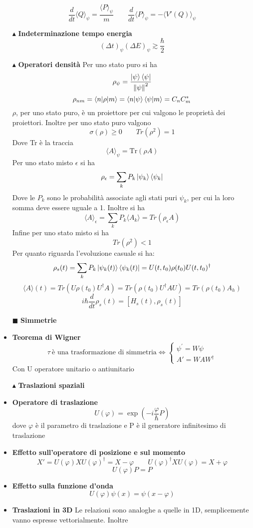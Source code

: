 \documentclass{book}
\newcommand{\g}{\textbf}
\newcommand{\e}{\begin{equation}}
\newcommand{\ex}{\end{equation} }
\renewcommand{\it}{\item[$\cdot$]}
\begin{document}
\begin{multicols}{4}
\begin{itemize}
        \e{\frac{d}{dt}\langle Q \rangle_{\psi} = \frac{\langle P \rangle_{\psi}}{m} \qquad \frac{d}{dt}\langle P \rangle_{\psi} = - \langle V'(Q) \rangle_{\psi}}\ex
        \item [$\blacktriangle$] \g{Indeterminazione tempo energia}
        \e{(\Delta t)_{\psi}(\Delta E)_{\psi} \gtrsim \frac{\hbar}{2}}\ex
        \item [$\blacktriangle$] \g{Operatori densità}
        Per uno stato puro si ha 
        \e{\rho_{\psi} = \frac{\ket{\psi}\bra{\psi}}{\norm{\psi}^{2}}}\ex
        \e{\rho_{nm} = \langle n|\rho|m\rangle = \braket{n}{\psi}\braket{\psi}{m} = C_{n}C_{m}^{*}}\ex
        $\rho$, per uno stato puro, è un proiettore per cui valgono le proprietà dei proiettori. Inoltre per uno stato puro valgono 
        \e{\sigma(\rho) \geq 0 \qquad Tr(\rho^{2}) = 1} \ex
        Dove Tr è la traccia
        \e{\langle A \rangle_{\psi} = \text{Tr}(\rho A)}\ex
        Per uno stato misto $\epsilon$ si ha 
        \e{\rho_{\epsilon} = \sum_{k}P_{k}\ket{\psi_{k}}\bra{\psi_{k}}}\ex
        Dove le $P_{k}$ sono le probabilità associate agli stati puri $\psi_{k}$, per cui la loro somma deve essere uguale a 1.
        Inoltre si ha 
        \e{\langle A \rangle_{\epsilon} = \sum_{k}P_{k}\langle A_{k}\rangle = Tr(\rho_{\epsilon}A)}\ex
        Infine per uno stato misto si ha 
        \e{Tr(\rho^{2}) < 1} \ex
        Per quanto riguarda l'evoluzione casuale si ha:
        \e{\rho_{s}(t) = \sum_{k}P_{k}\ket{\psi_{k}(t)}\bra{\psi_{k}(t)} = U(t,t_{0})\rho(t_{0})U(t,t_{0})^{\dagger}}\ex
        \e{\langle A \rangle(t) = Tr(U \rho(t_{0})U^{\dagger}A) = Tr(\rho(t_{0})U^{\dagger}AU) = Tr(\rho(t_{0})A_{h})} \ex
        \e{i \hbar \frac{d}{dt}\rho_{s}(t) = [H_{s}(t), \rho_{s}(t)]}\ex
        
     
\item [$\blacksquare$] \g{Simmetrie}
\it \g{Teorema di Wigner}
\e{\tau \ \text{è una trasformazione di simmetria} \iff \begin{cases}
    \psi^{'} = W \psi\\
    A' = WAW^{\dagger}
\end{cases}}\ex 
Con U operatore unitario o antiunitario

\item [$\blacktriangle$] \g{Traslazioni spaziali}
    \it \g{Operatore di traslazione}
        \e{U(\varphi) = \exp\left(-i\frac{\varphi}{\hbar} P\right)} \ex
        dove $\varphi$ è il parametro di traslazione e P è il generatore infinitesimo di traslazione
        \it \g{Effetto sull'operatore di posizione e sul momento}
        \e{X' = U(\varphi)XU(\varphi)^{\dagger} = X -\varphi \qquad U(\varphi)^{\dagger}XU(\varphi) = X +\varphi}\ex
        \e{U(\varphi) P = P} \ex
    \it \g{Effetto sulla funzione d'onda}
        \e{U(\varphi)\psi(x) = \psi(x - \varphi)} \ex
    \it \g{Traslazioni in 3D}
    Le relazioni sono analoghe a quelle in 1D, semplicemente vanno espresse vettorialmente. Inoltre
    

\end{itemize}
\end{multicols}
\end{document}
